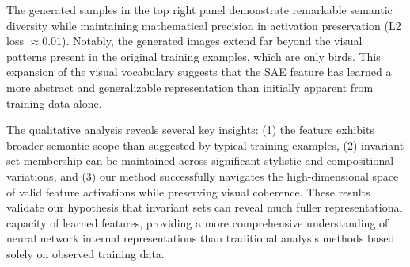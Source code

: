 \documentclass[licencjacka,en]{pracamgr}
\begin{document}
The generated samples in the top right panel demonstrate remarkable semantic diversity while maintaining mathematical precision in activation preservation (L2 loss $\approx 0.01$). Notably, the generated images extend far beyond the visual patterns present in the original training examples, which are only birds. This expansion of the visual vocabulary suggests that the SAE feature has learned a more abstract and generalizable representation than initially apparent from training data alone.

The qualitative analysis reveals several key insights: (1) the feature exhibits broader semantic scope than suggested by typical training examples, (2) invariant set membership can be maintained across significant stylistic and compositional variations, and (3) our method successfully navigates the high-dimensional space of valid feature activations while preserving visual coherence. These results validate our hypothesis that invariant sets can reveal much fuller representational capacity of learned features, providing a more comprehensive understanding of neural network internal representations than traditional analysis methods based solely on observed training data.
\end{document}
